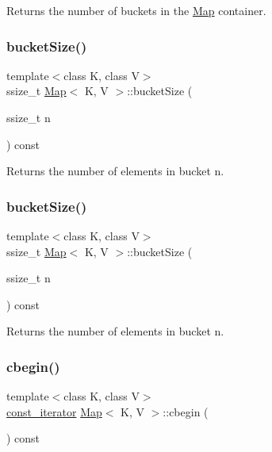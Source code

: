 Returns the number of buckets in the \hyperlink{classMap}{Map} container. \mbox{\label{classMap_ad78a1db4b42ed7c3d0f091cd3482b6de}} 
\subsubsection{\texorpdfstring{bucket\+Size()}{bucketSize()}\hspace{0.1cm}{\footnotesize\ttfamily [1/2]}}
{\footnotesize\ttfamily template$<$class K, class V$>$ \\
ssize\+\_\+t \hyperlink{classMap}{Map}$<$ K, V $>$\+::bucket\+Size (\begin{DoxyParamCaption}\item[{ssize\+\_\+t}]{n }\end{DoxyParamCaption}) const\hspace{0.3cm}{\ttfamily [inline]}}

Returns the number of elements in bucket n. \mbox{\label{classMap_ad78a1db4b42ed7c3d0f091cd3482b6de}} 
\subsubsection{\texorpdfstring{bucket\+Size()}{bucketSize()}\hspace{0.1cm}{\footnotesize\ttfamily [2/2]}}
{\footnotesize\ttfamily template$<$class K, class V$>$ \\
ssize\+\_\+t \hyperlink{classMap}{Map}$<$ K, V $>$\+::bucket\+Size (\begin{DoxyParamCaption}\item[{ssize\+\_\+t}]{n }\end{DoxyParamCaption}) const\hspace{0.3cm}{\ttfamily [inline]}}

Returns the number of elements in bucket n. \mbox{\label{classMap_a489400386fcc9a5e8acd21fbf2c528a1}} 
\subsubsection{\texorpdfstring{cbegin()}{cbegin()}\hspace{0.1cm}{\footnotesize\ttfamily [1/2]}}
{\footnotesize\ttfamily template$<$class K, class V$>$ \\
\hyperlink{classMap_add90fe1e25806ba6f6278b264e78ee9a}{const\+\_\+iterator} \hyperlink{classMap}{Map}$<$ K, V $>$\+::cbegin (\begin{DoxyParamCaption}{ }\end{DoxyParamCaption}) const\hspace{0.3cm}{\ttfamily [inline]}}


